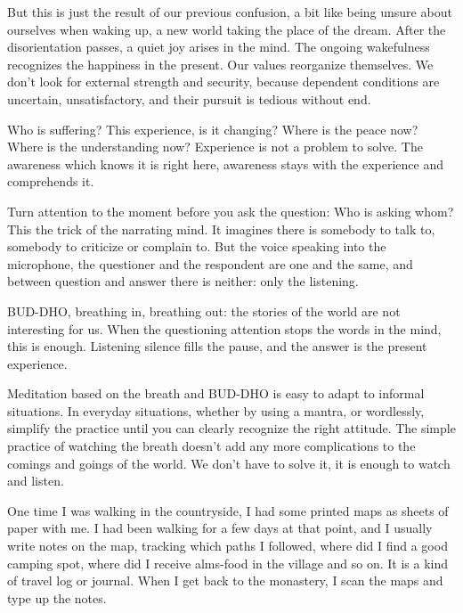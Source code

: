 But this is just the result of our previous confusion, a bit like being
unsure about ourselves when waking up, a new world taking the place of
the dream. After the disorientation passes, a quiet joy arises in the
mind. The ongoing wakefulness recognizes the happiness in the present.
Our values reorganize themselves. We don't look for external strength
and security, because dependent conditions are uncertain,
unsatisfactory, and their pursuit is tedious without end.

Who is suffering? This experience, is it changing? Where is the peace
now? Where is the understanding now? Experience is not a problem to
solve. The awareness which knows it is right here, awareness stays with
the experience and comprehends it.

Turn attention to the moment before you ask the question: Who is asking
whom? This the trick of the narrating mind. It imagines there is
somebody to talk to, somebody to criticize or complain to. But the voice
speaking into the microphone, the questioner and the respondent are one
and the same, and between question and answer there is neither: only the
listening.


BUD-DHO, breathing in, breathing out: the stories of the world are not
interesting for us. When the questioning attention stops the words in
the mind, this is enough. Listening silence fills the pause, and the
answer is the present experience.

Meditation based on the breath and BUD-DHO is easy to adapt to informal
situations. In everyday situations, whether by using a mantra, or
wordlessly, simplify the practice until you can clearly recognize the
right attitude. The simple practice of watching the breath doesn't add
any more complications to the comings and goings of the world. We don't
have to solve it, it is enough to watch and listen.


One time I was walking in the countryside, I had some printed maps as
sheets of paper with me. I had been walking for a few days at that
point, and I usually write notes on the map, tracking which paths I
followed, where did I find a good camping spot, where did I receive
alms-food in the village and so on. It is a kind of travel log or
journal. When I get back to the monastery, I scan the maps and type up
the notes.

